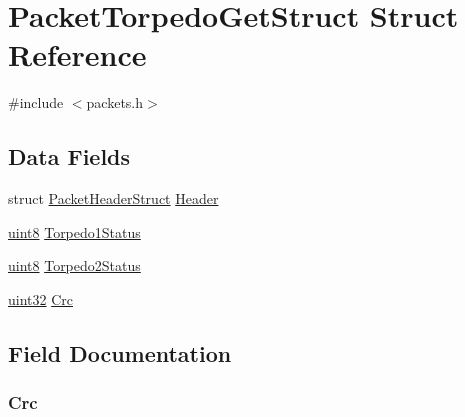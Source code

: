 \hypertarget{struct_packet_torpedo_get_struct}{}\section{Packet\+Torpedo\+Get\+Struct Struct Reference}
\label{struct_packet_torpedo_get_struct}


{\ttfamily \#include $<$packets.\+h$>$}

\subsection*{Data Fields}
\begin{DoxyCompactItemize}
\item 
struct \hyperlink{struct_packet_header_struct}{Packet\+Header\+Struct} \hyperlink{struct_packet_torpedo_get_struct_ab201af50281aff5ed4f984f994938007}{Header}
\item 
\hyperlink{_h_y_d_r_a_s_8_x_2types_8h_a33a5e996e7a90acefb8b1c0bea47e365}{uint8} \hyperlink{struct_packet_torpedo_get_struct_a047f48c23ea1e57620a92bd0b2fefa5d}{Torpedo1\+Status}
\item 
\hyperlink{_h_y_d_r_a_s_8_x_2types_8h_a33a5e996e7a90acefb8b1c0bea47e365}{uint8} \hyperlink{struct_packet_torpedo_get_struct_a70ca44ad881c12b1a1ef7ebb7edbe057}{Torpedo2\+Status}
\item 
\hyperlink{_h_y_d_r_a_s_8_x_2types_8h_acbd4acd0d29e2d6c43104827f77d9cd2}{uint32} \hyperlink{struct_packet_torpedo_get_struct_a1aaa4998291cff4c19ca5cca4b1e9489}{Crc}
\end{DoxyCompactItemize}


\subsection{Field Documentation}
\hypertarget{struct_packet_torpedo_get_struct_a1aaa4998291cff4c19ca5cca4b1e9489}{}
\subsubsection[{Crc}]{ Crc}\label{struct_packet_torpedo_get_struct_a1aaa4998291cff4c19ca5cca4b1e9489}
\hypertarget{struct_packet_torpedo_get_struct_ab201af50281aff5ed4f984f994938007}{}
